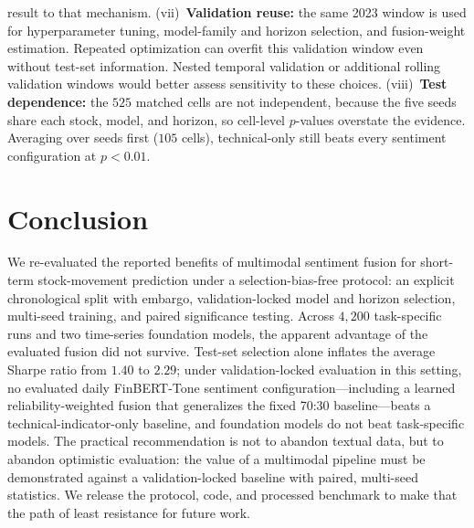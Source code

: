 \documentclass[conference]{IEEEtran}
\begin{document}
result to that mechanism.
(vii)~\textbf{Validation reuse:} the same 2023 window is used for hyperparameter
tuning, model-family and horizon selection, and fusion-weight estimation.
Repeated optimization can overfit this validation window even without test-set
information. Nested temporal validation or additional rolling validation
windows would better assess sensitivity to these choices.
(viii)~\textbf{Test dependence:} the $525$ matched cells are not independent,
because the five seeds share each stock, model, and horizon, so cell-level
$p$-values overstate the evidence. Averaging over seeds first ($105$ cells),
technical-only still beats every sentiment configuration at $p<0.01$.

\section{Conclusion}

We re-evaluated the reported benefits of multimodal sentiment fusion for
short-term stock-movement prediction under a selection-bias-free protocol: an
explicit chronological split with embargo, validation-locked model and horizon
selection, multi-seed training, and paired significance testing. Across $4{,}200$ task-specific runs
and two time-series foundation models, the apparent advantage of the evaluated fusion did not
survive. Test-set selection alone inflates the average Sharpe ratio from
$1.40$ to $2.29$; under validation-locked evaluation in this setting, no evaluated daily FinBERT-Tone sentiment
configuration---including a learned reliability-weighted fusion that
generalizes the fixed 70:30 baseline---beats a technical-indicator-only
baseline, and foundation models do not beat task-specific models. The practical
recommendation is not to abandon textual data, but to abandon optimistic
evaluation: the value of a multimodal pipeline must be demonstrated against a
validation-locked baseline with paired, multi-seed statistics. We release the
protocol, code, and processed benchmark to make that the path of least
resistance for future work.
\end{document}
